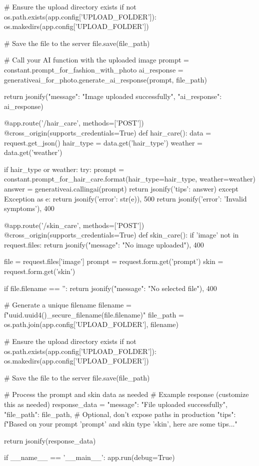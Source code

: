     # Ensure the upload directory exists
    if not os.path.exists(app.config['UPLOAD_FOLDER']):
        os.makedirs(app.config['UPLOAD_FOLDER'])

    # Save the file to the server
    file.save(file_path)

    # Call your AI function with the uploaded image
    prompt = constant.prompt_for_fashion_with_photo
    ai_response = generativeai_for_photo.generate_ai_response(prompt, file_path)

    return jsonify({"message": "Image uploaded successfully", "ai_response": ai_response})

@app.route('/hair_care', methods=['POST'])
@cross_origin(supports_credentials=True)
def hair_care():
    data = request.get_json()
    hair_type = data.get('hair_type')
    weather = data.get('weather')
    
    if hair_type or weather:
        try:
            prompt = constant.prompt_for_hair_care.format(hair_type=hair_type, weather=weather)
            answer = generativeai.callingai(prompt)  
            return jsonify({'tips': answer})  
        except Exception as e:
            return jsonify({'error': str(e)}), 500  
    return jsonify({'error': 'Invalid symptoms'}), 400

@app.route('/skin_care', methods=['POST'])
@cross_origin(supports_credentials=True)
def skin_care():
    if 'image' not in request.files:
        return jsonify({"message": "No image uploaded"}), 400

    file = request.files['image']
    prompt = request.form.get('prompt')
    skin = request.form.get('skin')

    if file.filename == '':
        return jsonify({"message": "No selected file"}), 400

    # Generate a unique filename
    filename = f"{uuid.uuid4()}_{secure_filename(file.filename)}"
    file_path = os.path.join(app.config['UPLOAD_FOLDER'], filename)
    
    # Ensure the upload directory exists
    if not os.path.exists(app.config['UPLOAD_FOLDER']):
        os.makedirs(app.config['UPLOAD_FOLDER'])

    # Save the file to the server
    file.save(file_path)
    
    # Process the prompt and skin data as needed
    # Example response (customize this as needed)
    response_data = {
        "message": "File uploaded successfully",
        "file_path": file_path,  # Optional, don't expose paths in production
        "tips": f"Based on your prompt '{prompt}' and skin type '{skin}', here are some tips..."
    }
    
    return jsonify(response_data)

if __name__ == '__main__':
    app.run(debug=True)
